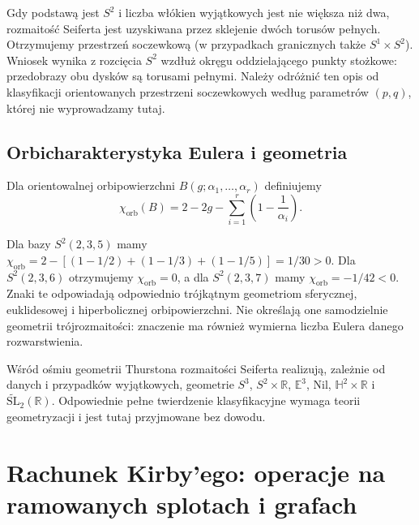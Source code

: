 \begin{uwaga}
Gdy podstawą jest $S^2$ i liczba włókien wyjątkowych
jest nie większa niż dwa, rozmaitość Seiferta jest
uzyskiwana przez sklejenie dwóch torusów pełnych.
Otrzymujemy przestrzeń soczewkową (w przypadkach
granicznych także $S^1\times S^2$). Wniosek wynika
z rozcięcia $S^2$ wzdłuż okręgu oddzielającego
punkty stożkowe: przedobrazy obu dysków są torusami
pełnymi. Należy odróżnić ten opis od klasyfikacji
orientowanych przestrzeni soczewkowych według
parametrów $(p,q)$, której nie wyprowadzamy tutaj.
\end{uwaga}

\section{Orbicharakterystyka Eulera i geometria}
\label{sec:tg-seifert-orbifold}

\begin{definicja}[Orbicharakterystyka]
Dla orientowalnej orbipowierzchni
$B(g;\alpha_1,\ldots,\alpha_r)$ definiujemy
\[
\chi_{\mathrm{orb}}(B)=2-2g-
\sum_{i=1}^r\left(1-\frac1{\alpha_i}\right).
\]
\end{definicja}

\begin{przyklad}
Dla bazy $S^2(2,3,5)$ mamy
$\chi_{\mathrm{orb}}=2-[(1-1/2)+(1-1/3)+(1-1/5)]
=1/30>0$. Dla $S^2(2,3,6)$ otrzymujemy
$\chi_{\mathrm{orb}}=0$, a dla $S^2(2,3,7)$ mamy
$\chi_{\mathrm{orb}}=-1/42<0$.
Znaki te odpowiadają odpowiednio trójkątnym
geometriom sferycznej, euklidesowej i hiperbolicznej
orbipowierzchni. Nie określają one samodzielnie geometrii
trójrozmaitości: znaczenie ma również wymierna
liczba Eulera danego rozwarstwienia.
\end{przyklad}

\begin{uwaga}
Wśród ośmiu geometrii Thurstona rozmaitości Seiferta
realizują, zależnie od danych i przypadków wyjątkowych,
geometrie $S^3$, $S^2\times\mathbb R$, $\mathbb E^3$,
$\mathrm{Nil}$, $\mathbb H^2\times\mathbb R$
i $\widetilde{\mathrm{SL}}_2(\mathbb R)$.
Odpowiednie pełne twierdzenie klasyfikacyjne wymaga
teorii geometryzacji i jest tutaj przyjmowane bez dowodu.
\end{uwaga}

\chapter{Rachunek Kirby'ego: operacje na ramowanych splotach i grafach}
\label{ch:tg-kirby-full}

